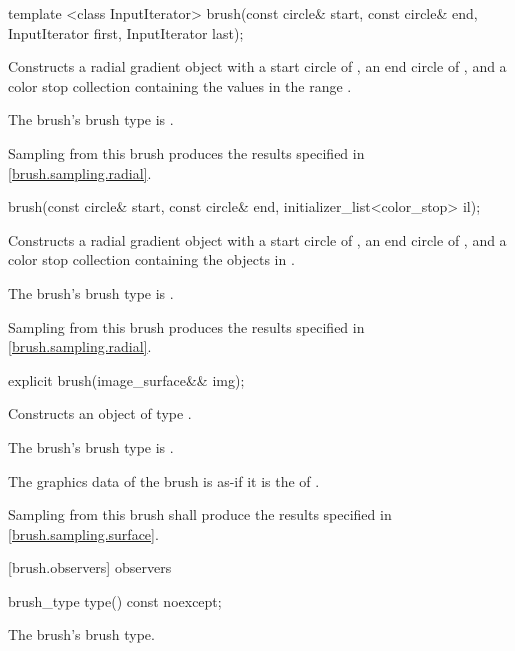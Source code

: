 \begin{itemdecl}
template <class InputIterator>
brush(const circle& start, const circle& end,
  InputIterator first, InputIterator last);
\end{itemdecl}
\begin{itemdescr}
\pnum
\effects
Constructs a radial gradient  object with a start circle of , an end circle of , and a color stop collection containing the values in the range .

\pnum
The brush's brush type is .

\pnum
\remarks
Sampling from this brush produces the results specified in \ref{brush.sampling.radial}.
\end{itemdescr}

\begin{itemdecl}
brush(const circle& start, const circle& end,
  initializer_list<color_stop> il);
\end{itemdecl}
\begin{itemdescr}
\pnum
\effects
Constructs a radial gradient  object with a start circle of , an end circle of , and a color stop collection containing the  objects in .

\pnum
The brush's brush type is .

\pnum
\remarks
Sampling from this brush produces the results specified in \ref{brush.sampling.radial}.
\end{itemdescr}

\begin{itemdecl}
explicit brush(image_surface&& img);
\end{itemdecl}
\begin{itemdescr}
\pnum
\pnum
\effects
Constructs an object of type .

\pnum
The brush's brush type is .

\pnum
The graphics data of the brush is as-if it is the \underlyingimagesurface of .

\pnum
\remarks
Sampling from this brush shall produce the results specified in \ref{brush.sampling.surface}.
\end{itemdescr}

 [brush.observers]{ observers}

\begin{itemdecl}
brush_type type() const noexcept;
\end{itemdecl}
\begin{itemdescr}
\pnum
\returns
The brush's brush type.
\end{itemdescr}
